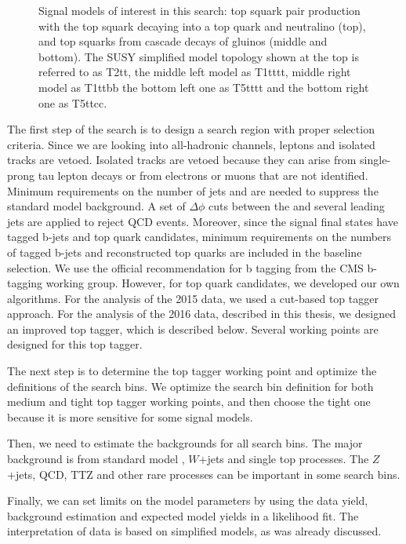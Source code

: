 \begin{figure}[ht!]
\begin{centering}
\caption{Signal models of interest in this search:
top squark pair production with the top squark decaying into a top quark and
neutralino (top),
and top squarks from cascade decays of gluinos (middle and bottom).
The SUSY simplified model topology shown at the top is referred to as T2tt,
the middle left model as T1tttt, middle right model as T1ttbb
the bottom left one as T5tttt and the bottom right one as T5ttcc.}
\label{fig:signal_diagrams}
\end{centering}
\end{figure}

The first step of the search is to design a search region with proper selection criteria. Since we are looking into all-hadronic channels, leptons and isolated tracks are vetoed. Isolated tracks are vetoed because they can arise from single-prong tau lepton decays or from electrons or muons that are not identified. Minimum requirements on the number of jets and \MET are needed to suppress the standard model background. A set of $\Delta\phi$ cuts between the \MET and several leading jets are applied to reject QCD events. Moreover, since the signal final states have tagged b-jets and top quark candidates, minimum requirements on the numbers of tagged b-jets and reconstructed top quarks are included in the baseline selection. We use the official recommendation for b tagging from the CMS b-tagging working group. However, for top quark candidates, we developed our own algorithms. For the analysis of the 2015 data, we used a cut-based top tagger approach\cite{PhysRevD.96.012004}. For the analysis of the 2016 data, described in this thesis, we designed an improved top tagger, which is described below. Several working points are designed for this top tagger.

The next step is to determine the top tagger working point and optimize the definitions of the search bins. We optimize the search bin definition for both medium and tight top tagger working points, and then choose the tight one because it is more sensitive for some signal models.

Then, we need to estimate the backgrounds for all search bins. The major background is from standard model \ttbar, $W$+jets and single top processes. The $Z$+jets, QCD, TTZ and other rare processes can be important in some search bins.

Finally, we can set limits on the model parameters by using the data yield, background estimation and expected model yields in a likelihood fit. The interpretation of data is based on simplified models\cite{Alwall:2008ag}, as was already discussed.

